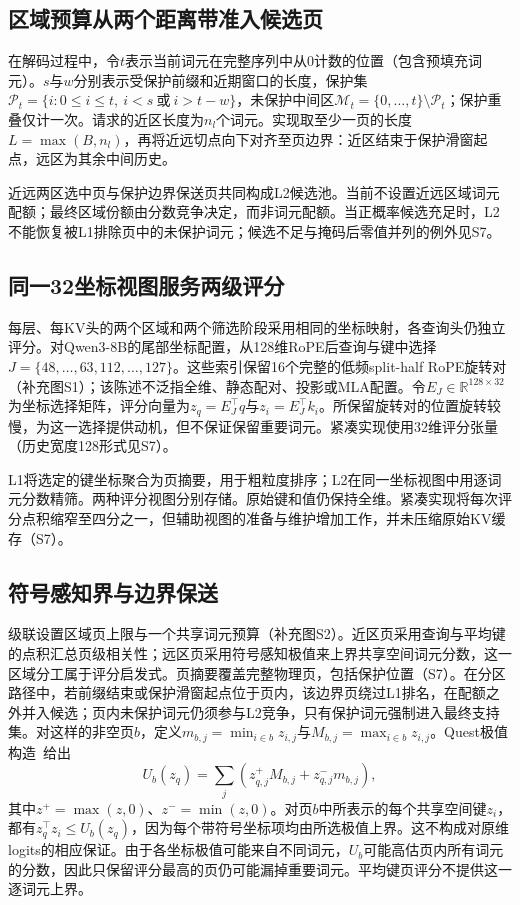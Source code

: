 \documentclass[conference,9pt,letterpaper]{IEEEtran}
\begin{document}
\subsection{区域预算从两个距离带准入候选页}
在解码过程中，令$t$表示当前词元在完整序列中从0计数的位置（包含预填充词元）。$s$与$w$分别表示受保护前缀和近期窗口的长度，保护集$\mathcal P_t=\{i:0\le i\le t,\ i<s\ \text{或}\ i>t-w\}$，未保护中间区$\mathcal M_t=\{0,\ldots,t\}\setminus\mathcal P_t$；保护重叠仅计一次。请求的近区长度为$n_l$个词元。实现取至少一页的长度$L=\max(B,n_l)$，再将近远切点向下对齐至页边界：近区结束于保护滑窗起点，远区为其余中间历史。

近远两区选中页与保护边界保送页共同构成L2候选池。当前不设置近远区域词元配额；最终区域份额由分数竞争决定，而非词元配额。当正概率候选充足时，L2不能恢复被L1排除页中的未保护词元；候选不足与掩码后零值并列的例外见S7。

\subsection{同一32坐标视图服务两级评分}
每层、每KV头的两个区域和两个筛选阶段采用相同的坐标映射，各查询头仍独立评分。对Qwen3-8B的尾部坐标配置，从128维RoPE后查询与键中选择$J=\{48,\ldots,63,112,\ldots,127\}$。这些索引保留16个完整的低频split-half RoPE旋转对（补充图S1）；该陈述不泛指全维、静态配对、投影或MLA配置。令$E_J\in\mathbb R^{128\times32}$为坐标选择矩阵，评分向量为$z_q=E_J^\top q$与$z_i=E_J^\top k_i$。所保留旋转对的位置旋转较慢，为这一选择提供动机，但不保证保留重要词元。紧凑实现使用32维评分张量（历史宽度128形式见S7）。

L1将选定的键坐标聚合为页摘要，用于粗粒度排序；L2在同一坐标视图中用逐词元分数精筛。两种评分视图分别存储。原始键和值仍保持全维。紧凑实现将每次评分点积缩窄至四分之一，但辅助视图的准备与维护增加工作，并未压缩原始KV缓存（S7）。

\subsection{符号感知界与边界保送}
级联设置区域页上限与一个共享词元预算（补充图S2）。近区页采用查询与平均键的点积汇总页级相关性；远区页采用符号感知极值来上界共享空间词元分数，这一区域分工属于评分启发式。页摘要覆盖完整物理页，包括保护位置（S7）。在分区路径中，若前缀结束或保护滑窗起点位于页内，该边界页绕过L1排名，在配额之外并入候选；页内未保护词元仍须参与L2竞争，只有保护词元强制进入最终支持集。对这样的非空页$b$，定义$m_{b,j}=\min_{i\in b}z_{i,j}$与$M_{b,j}=\max_{i\in b}z_{i,j}$。Quest极值构造~\cite{quest}给出
\begin{equation}
U_b(z_q)=\sum_j(z_{q,j}^{+}M_{b,j}+z_{q,j}^{-}m_{b,j}),
\end{equation}
其中$z^+=\max(z,0)$、$z^-=\min(z,0)$。对页$b$中所表示的每个共享空间键$z_i$，都有$z_q^\top z_i\leq U_b(z_q)$，因为每个带符号坐标项均由所选极值上界。这不构成对原维logits的相应保证。由于各坐标极值可能来自不同词元，$U_b$可能高估页内所有词元的分数，因此只保留评分最高的页仍可能漏掉重要词元。平均键页评分不提供这一逐词元上界。
\end{document}
